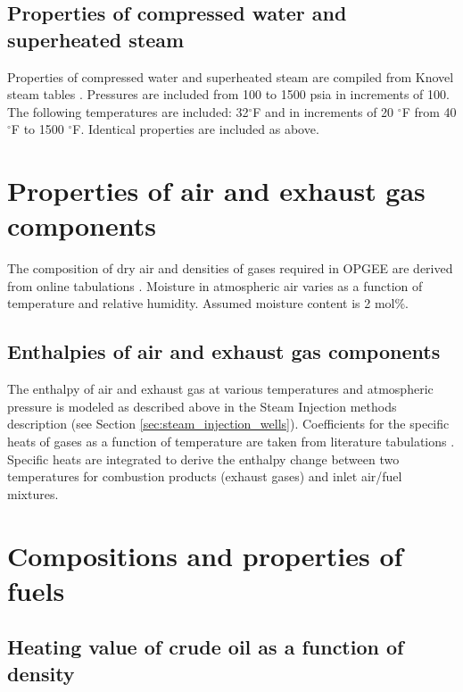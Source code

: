 \documentclass[11pt]{report}
\begin{document}
\subsection{Properties of compressed water and superheated steam}
Properties of compressed water and superheated steam are compiled  from Knovel steam tables \cite[Table 2b]{Knovel}. Pressures are included from 100 to 1500 psia in increments of 100. The following temperatures are included: 32$^\circ$F and in increments of 20 $^\circ$F from 40 $^\circ$F to 1500 $^\circ$F. Identical properties are included as above.



\section{Properties of air and exhaust gas components}

The composition of dry air and densities of gases required in OPGEE are derived from online tabulations \cite{EngToolbox}. Moisture in atmospheric air varies as a function of temperature and relative humidity. Assumed moisture content is 2 mol\%.


\subsection{Enthalpies of air and exhaust gas components}\label{sec:flue_gas_enthalpy}

The enthalpy of air and exhaust gas at various temperatures and atmospheric pressure is modeled as described above in the Steam Injection methods description (see Section \ref{sec:steam_injection_wells}).  Coefficients for the specific heats of gases as a function of temperature are taken from literature tabulations \cite[Table A2-E]{Cengel2006}. Specific heats are integrated to derive the enthalpy change between two temperatures for combustion products (exhaust gases) and inlet air/fuel mixtures.




\section{Compositions and properties of fuels}\label{sec:properties_fuels}


\subsection{Heating value of crude oil as a function of density}
\end{document}
